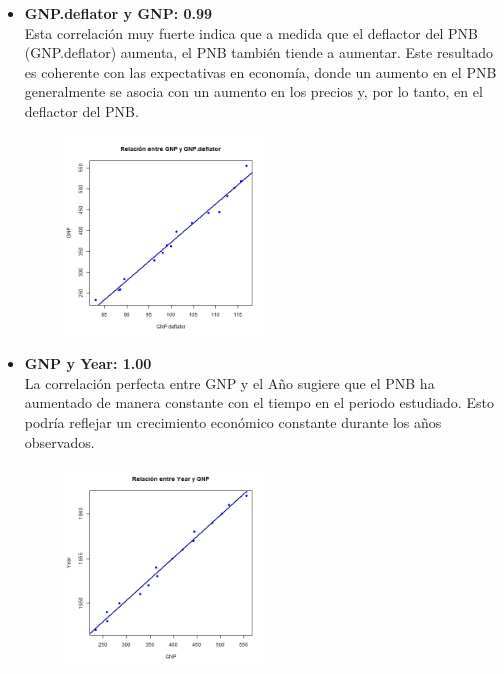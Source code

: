 \documentclass{article}
\begin{document}
    \begin{itemize}
        \item \textbf{GNP.deflator y GNP: 0.99} \\
        Esta correlación muy fuerte indica que a medida que el deflactor del PNB (GNP.deflator) aumenta, el PNB también tiende a aumentar. Este resultado es coherente con las expectativas en economía, donde un aumento en el PNB generalmente se asocia con un aumento en los precios y, por lo tanto, en el deflactor del PNB.
        
        \begin{figure}[H]
            \centering
            \includegraphics[width=0.5\textwidth]{GraficosDispersion/GNP.deflator_vs_GNP.png}
            \label{fig:GNP.deflator_vs_GNP}
            \vspace{0.5cm} %
        \end{figure}
           

        \item \textbf{GNP y Year: 1.00} \\
        La correlación perfecta entre GNP y el Año sugiere que el PNB ha aumentado de manera constante con el tiempo en el periodo estudiado. Esto podría reflejar un crecimiento económico constante durante los años observados.
        
        \begin{figure}[H]
            \centering
            \includegraphics[width=0.5\textwidth]{GraficosDispersion/GNP_vs_Year.png}
            \label{fig:GNP_vs_Year}
            \vspace{0.5cm} %
        \end{figure}


\end{itemize}
\end{document}
